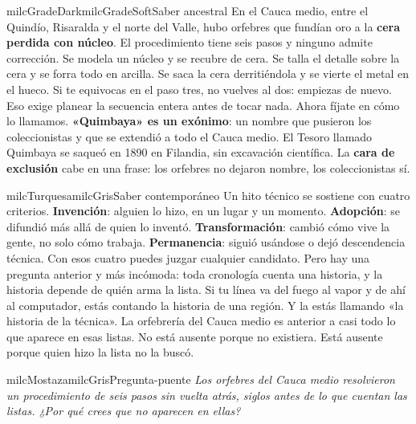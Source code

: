 \documentclass[11pt,letterpaper]{article}
\begin{document}
\begin{softbox}{milcGradeDark}{milcGradeSoft}{Saber ancestral}
En el Cauca medio, entre el Quindío, Risaralda y el norte del Valle, hubo orfebres que fundían oro a la \textbf{cera perdida con núcleo}. El procedimiento tiene seis pasos y ninguno admite corrección. Se modela un núcleo y se recubre de cera. Se talla el detalle sobre la cera y se forra todo en arcilla. Se saca la cera derritiéndola y se vierte el metal en el hueco. Si te equivocas en el paso tres, no vuelves al dos: empiezas de nuevo. Eso exige planear la secuencia entera antes de tocar nada. Ahora fíjate en cómo lo llamamos. \textbf{«Quimbaya» es un exónimo}: un nombre que pusieron los coleccionistas y que se extendió a todo el Cauca medio. El Tesoro llamado Quimbaya se saqueó en 1890 en Filandia, sin excavación científica. La \textbf{cara de exclusión} cabe en una frase: los orfebres no dejaron nombre, los coleccionistas sí.\par{}
\end{softbox}

\begin{softbox}{milcTurquesa}{milcGris}{Saber contemporáneo}
Un hito técnico se sostiene con cuatro criterios. \textbf{Invención}: alguien lo hizo, en un lugar y un momento. \textbf{Adopción}: se difundió más allá de quien lo inventó. \textbf{Transformación}: cambió cómo vive la gente, no solo cómo trabaja. \textbf{Permanencia}: siguió usándose o dejó descendencia técnica. Con esos cuatro puedes juzgar cualquier candidato. Pero hay una pregunta anterior y más incómoda: toda cronología cuenta una historia, y la historia depende de quién arma la lista. Si tu línea va del fuego al vapor y de ahí al computador, estás contando la historia de una región. Y la estás llamando «la historia de la técnica». La orfebrería del Cauca medio es anterior a casi todo lo que aparece en esas listas. No está ausente porque no existiera. Está ausente porque quien hizo la lista no la buscó.
\end{softbox}

\begin{softbox}{milcMostaza}{milcGris}{Pregunta-puente}
\textit{Los orfebres del Cauca medio resolvieron un procedimiento de seis pasos sin vuelta atrás, siglos antes de lo que cuentan las listas. ¿Por qué crees que no aparecen en ellas?}
\end{softbox}
\end{document}
